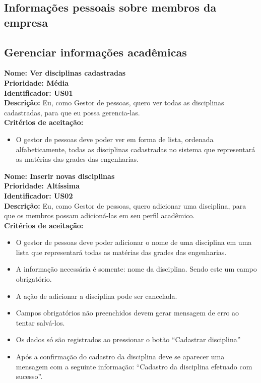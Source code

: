 \begin{anexosenv}
\section{Informações pessoais sobre membros da empresa}
\subsection{Gerenciar informações acadêmicas}

\indent \textbf{Nome: Ver disciplinas cadastradas\\
    \indent Prioridade: Média\\
    \indent Identificador: US01\\
    \indent Descrição:}
    Eu, como Gestor de pessoas, quero ver todas as disciplinas cadastradas, para que eu possa gerencia-las.\\
\indent \textbf{Critérios de aceitação:}
 \begin{itemize}
            \item O gestor de pessoas deve poder ver em forma de lista, ordenada alfabeticamente, todas as disciplinas cadastradas no sistema que representará as matérias das grades das engenharias.
\end{itemize}
        

\indent \textbf{Nome: Inserir novas disciplinas\\
    \indent Prioridade: Altíssima\\
    \indent Identificador: US02\\
    \indent Descrição:} Eu, como Gestor de pessoas, quero adicionar uma disciplina, para que os membros possam adicioná-las em seu perfil acadêmico.\\
\indent \textbf{Critérios de aceitação:}
\begin{itemize}
            \item O gestor de pessoas deve poder adicionar o nome de uma disciplina em uma lista que representará todas as matérias das grades das engenharias.
            \item A informação necessária é somente: nome da disciplina. Sendo este um campo obrigatório.
            \item A ação de adicionar a disciplina pode ser cancelada.
            \item Campos obrigatórios não preenchidos devem gerar mensagem de erro ao tentar salvá-los.
            \item Os dados só são registrados ao pressionar o botão “Cadastrar disciplina”
            \item   Após a confirmação do cadastro da disciplina deve se aparecer uma mensagem com a seguinte informação: “Cadastro da disciplina efetuado com sucesso”.
\end{itemize}



\end{anexosenv}
